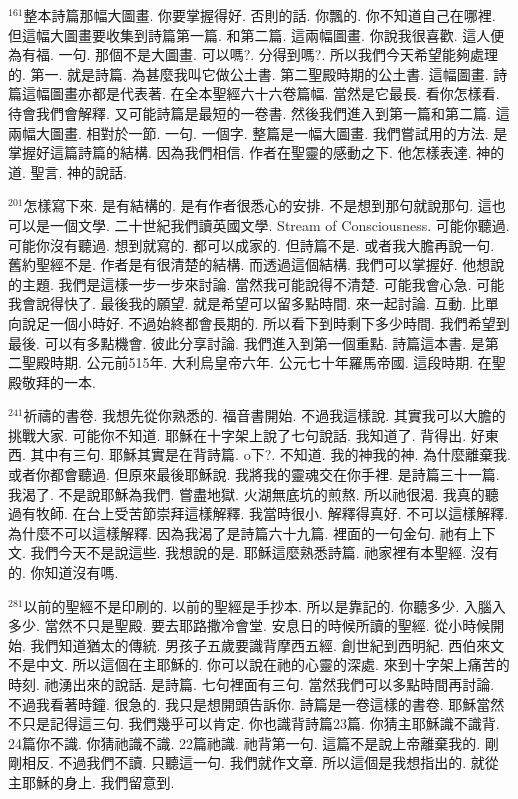 \documentclass{book}
\begin{document}
$^{161}$整本詩篇那幅大圖畫.
你要掌握得好.
否則的話.
你飄的.
你不知道自己在哪裡.
但這幅大圖畫要收集到詩篇第一篇.
和第二篇.
這兩幅圖畫.
你說我很喜歡.
這人便為有福.
一句.
那個不是大圖畫.
可以嗎?.
分得到嗎?.
所以我們今天希望能夠處理的.
第一.
就是詩篇.
為甚麼我叫它做公土書.
第二聖殿時期的公土書.
這幅圖畫.
詩篇這幅圖畫亦都是代表著.
在全本聖經六十六卷篇幅.
當然是它最長.
看你怎樣看.
待會我們會解釋.
又可能詩篇是最短的一卷書.
然後我們進入到第一篇和第二篇.
這兩幅大圖畫.
相對於一節.
一句.
一個字.
整篇是一幅大圖畫.
我們嘗試用的方法.
是掌握好這篇詩篇的結構.
因為我們相信.
作者在聖靈的感動之下.
他怎樣表達.
神的道.
聖言.
神的說話.

$^{201}$怎樣寫下來.
是有結構的.
是有作者很悉心的安排.
不是想到那句就說那句.
這也可以是一個文學.
二十世紀我們讀英國文學.
Stream of Consciousness.
可能你聽過.
可能你沒有聽過.
想到就寫的.
都可以成家的.
但詩篇不是.
或者我大膽再說一句.
舊約聖經不是.
作者是有很清楚的結構.
而透過這個結構.
我們可以掌握好.
他想說的主題.
我們是這樣一步一步來討論.
當然我可能說得不清楚.
可能我會心急.
可能我會說得快了.
最後我的願望.
就是希望可以留多點時間.
來一起討論.
互動.
比單向說足一個小時好.
不過始終都會長期的.
所以看下到時剩下多少時間.
我們希望到最後.
可以有多點機會.
彼此分享討論.
我們進入到第一個重點.
詩篇這本書.
是第二聖殿時期.
公元前515年.
大利烏皇帝六年.
公元七十年羅馬帝國.
這段時期.
在聖殿敬拜的一本.

$^{241}$祈禱的書卷.
我想先從你熟悉的.
福音書開始.
不過我這樣說.
其實我可以大膽的挑戰大家.
可能你不知道.
耶穌在十字架上說了七句說話.
我知道了.
背得出.
好東西.
其中有三句.
耶穌其實是在背詩篇.
o下?.
不知道.
我的神我的神.
為什麼離棄我.
或者你都會聽過.
但原來最後耶穌說.
我將我的靈魂交在你手裡.
是詩篇三十一篇.
我渴了.
不是說耶穌為我們.
嘗盡地獄.
火湖無底坑的煎熬.
所以祂很渴.
我真的聽過有牧師.
在台上受苦節崇拜這樣解釋.
我當時很小.
解釋得真好.
不可以這樣解釋.
為什麼不可以這樣解釋.
因為我渴了是詩篇六十九篇.
裡面的一句金句.
祂有上下文.
我們今天不是說這些.
我想說的是.
耶穌這麼熟悉詩篇.
祂家裡有本聖經.
沒有的.
你知道沒有嗎.

$^{281}$以前的聖經不是印刷的.
以前的聖經是手抄本.
所以是靠記的.
你聽多少.
入腦入多少.
當然不只是聖殿.
要去耶路撒冷會堂.
安息日的時候所讀的聖經.
從小時候開始.
我們知道猶太的傳統.
男孩子五歲要識背摩西五經.
創世紀到西明紀.
西伯來文不是中文.
所以這個在主耶穌的.
你可以說在祂的心靈的深處.
來到十字架上痛苦的時刻.
祂湧出來的說話.
是詩篇.
七句裡面有三句.
當然我們可以多點時間再討論.
不過我看著時鐘.
很急的.
我只是想開頭告訴你.
詩篇是一卷這樣的書卷.
耶穌當然不只是記得這三句.
我們幾乎可以肯定.
你也識背詩篇23篇.
你猜主耶穌識不識背.
24篇你不識.
你猜祂識不識.
22篇祂識.
祂背第一句.
這篇不是說上帝離棄我的.
剛剛相反.
不過我們不讀.
只聽這一句.
我們就作文章.
所以這個是我想指出的.
就從主耶穌的身上.
我們留意到.
\end{document}
